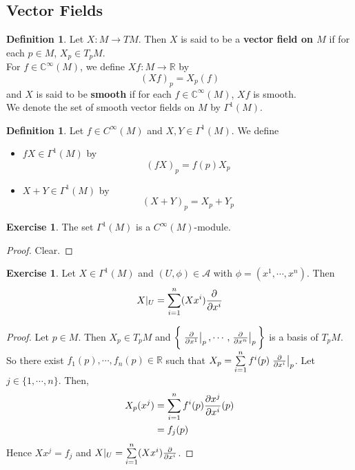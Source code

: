 \documentclass[12pt]{amsart}
\theoremstyle{definition}
\newtheorem{defn}[definition]{Definition}
\newtheorem{ex}[definition]{Exercise}
\newcommand{\Gam}{\Gamma}
\newcommand{\C}{\mathbb{C}}
\newcommand{\R}{\mathbb{R}}
\newcommand{\MA}{\mathcal{A}}
\begin{document}
	
	
	
	
	
	
	
	
	
	
	
	
	
	\newpage	
	\subsection{Vector Fields}
	
	\begin{defn}
		Let $X: M \rightarrow TM$. Then $X$ is said to be a \textbf{vector field on $M$} if for each $p \in M$, $X_p \in T_p M$. \\
		For $f \in \C^{\infty}(M)$, we define $Xf : M \rightarrow \R$ by $$(Xf)_p = X_p(f)$$ 
		and $X$ is said to be \textbf{smooth} if for each $f \in \C^{\infty}(M)$, $Xf$ is smooth.\\
		We denote the set of smooth vector fields on $M$ by $\Gam^1(M)$.
	\end{defn}

	\begin{defn}
	Let $f \in C^{\infty}(M)$ and $X,Y \in \Gam^1(M)$. We define 
	\begin{itemize}
	\item $fX \in \Gam^1(M)$ by $$(fX)_p = f(p)X_p$$
	\item $X+Y \in \Gam^1(M)$ by $$(X+Y)_p = X_p+Y_p$$
	\end{itemize}
	\end{defn}
	
	\begin{ex}
	The set $\Gam^1(M)$ is a $C^{\infty}(M)$-module.
	\end{ex}
	
	\begin{proof}
	Clear.
	\end{proof}

	\begin{ex}
		Let $X \in \Gam^1(M)$ and $(U, \phi) \in \MA$ with $\phi = (x^1, \cdots, x^n)$. Then $$X|_U = \sum_{i=1}^n (Xx^i) \pdv{x^i}$$ 
	\end{ex}

	\begin{proof}
		Let $p \in M$. Then $X_p \in T_pM$ and $\bigg \{ \eval{\pdv{x^1}}_{p}, \cdots, \eval{\pdv{x^n}}_{p} \bigg \}$ is a basis of $T_pM$. So there exist $f_1(p), \cdots, f_n(p) \in \R$ such that $X_p = \sum\limits_{i=1}^n f^i(p) \eval{\pdv{x^i}}_{p}$. Let $j \in \{1, \cdots, n\}$. Then,
		\begin{align*}
			X_p(x^j) 
			&= \sum\limits_{i=1}^n f^i(p) {\pdv{x^j}{x^i}}(p) \\
			&= f_j(p) \\
		\end{align*} 
		Hence $Xx^j = f_j$ and $X|_U = \sum\limits_{i=1}^n (Xx^i) \pdv{x^i}$.
	\end{proof}
	
\end{document}
